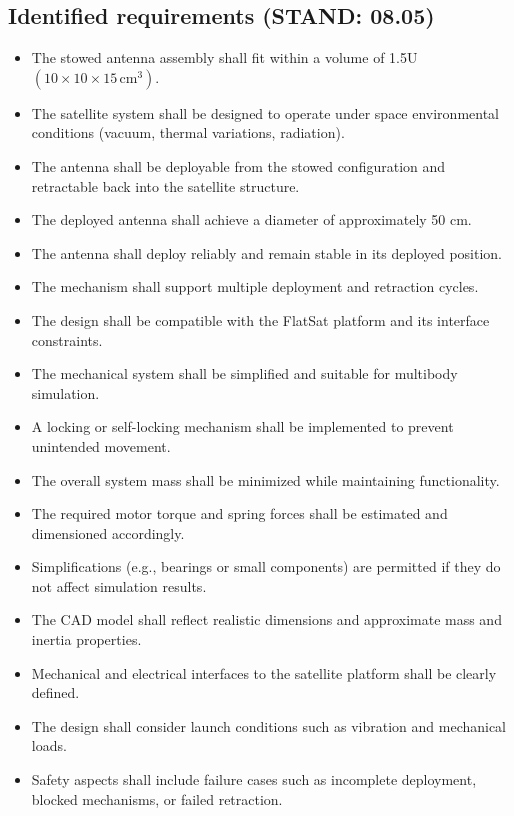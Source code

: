 	\subsection{Identified requirements (STAND: 08.05)}
	\begin{itemize}
		\item The stowed antenna assembly shall fit within a volume of 1.5U $(10 \times 10 \times 15\,\mathrm{cm^3})$.
		
		\item The satellite system shall be designed to operate under space environmental conditions (vacuum, thermal variations, radiation).
		
		\item The antenna shall be deployable from the stowed configuration and retractable back into the satellite structure.
		
		\item The deployed antenna shall achieve a diameter of approximately 50 cm.
		
		\item The antenna shall deploy reliably and remain stable in its deployed position.
		
		\item The mechanism shall support multiple deployment and retraction cycles.
		
		\item The design shall be compatible with the FlatSat platform and its interface constraints.
		
		\item The mechanical system shall be simplified and suitable for multibody simulation.
		
		\item A locking or self-locking mechanism shall be implemented to prevent unintended movement.
		
		\item The overall system mass shall be minimized while maintaining functionality.
		
		\item The required motor torque and spring forces shall be estimated and dimensioned accordingly.
		
		\item Simplifications (e.g., bearings or small components) are permitted if they do not affect simulation results.
		
		\item The CAD model shall reflect realistic dimensions and approximate mass and inertia properties.
		
		\item Mechanical and electrical interfaces to the satellite platform shall be clearly defined.
		
		\item The design shall consider launch conditions such as vibration and mechanical loads.
		
		\item Safety aspects shall include failure cases such as incomplete deployment, blocked mechanisms, or failed retraction.
	\end{itemize}
	\newpage

